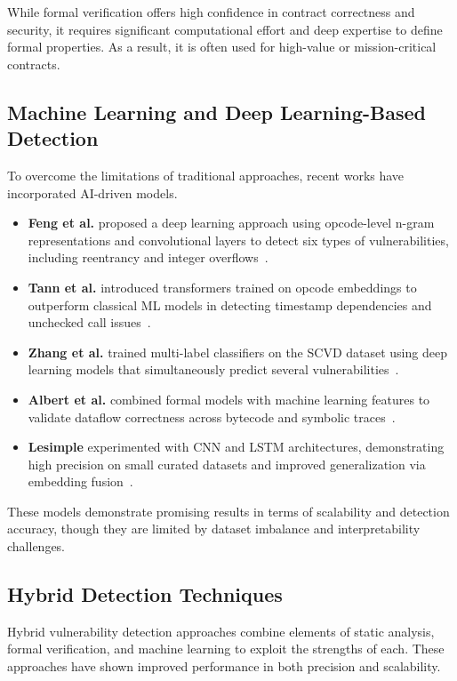 While formal verification offers high confidence in contract correctness and security, it requires significant computational effort and deep expertise to define formal properties. As a result, it is often used for high-value or mission-critical contracts.

\subsection*{Machine Learning and Deep Learning-Based Detection}

To overcome the limitations of traditional approaches, recent works have incorporated AI-driven models.

\begin{itemize}
  \item \textbf{Feng et al.} proposed a deep learning approach using opcode-level n-gram representations and convolutional layers to detect six types of vulnerabilities, including reentrancy and integer overflows~\cite{feng2024interpretable}.
  \item \textbf{Tann et al.} introduced transformers trained on opcode embeddings to outperform classical ML models in detecting timestamp dependencies and unchecked call issues~\cite{tann2020towards}.
  \item \textbf{Zhang et al.} trained multi-label classifiers on the SCVD dataset using deep learning models that simultaneously predict several vulnerabilities~\cite{zhang2020scvd}.
  \item \textbf{Albert et al.} combined formal models with machine learning features to validate dataflow correctness across bytecode and symbolic traces~\cite{albert2019safevm}.
  \item \textbf{Lesimple} experimented with CNN and LSTM architectures, demonstrating high precision on small curated datasets and improved generalization via embedding fusion~\cite{lesimple2020master}.
\end{itemize}

These models demonstrate promising results in terms of scalability and detection accuracy, though they are limited by dataset imbalance and interpretability challenges.

\subsection*{Hybrid Detection Techniques}

Hybrid vulnerability detection approaches combine elements of static analysis, formal verification, and machine learning to exploit the strengths of each. These approaches have shown improved performance in both precision and scalability.

